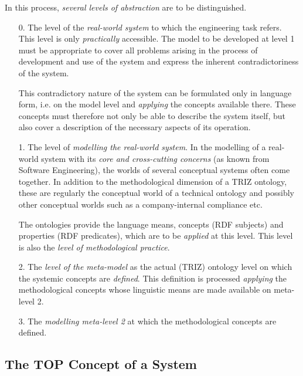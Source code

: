 \documentclass[11pt,a4paper]{article}
\begin{document}
In this process, \emph{several levels of abstraction} are to be distinguished.
\begin{itemize}[noitemsep]
\item [0.] The level of the \emph{real-world system} to which the engineering
  task refers. This level is only \emph{practically} accessible. The model to
  be developed at level 1 must be appropriate to cover all problems arising in
  the process of development and use of the system and express the inherent
  contradictoriness of the system.

  This contradictory nature of the system can be formulated only in language
  form, i.e. on the model level and \emph{applying} the concepts available
  there.  These concepts must therefore not only be able to describe the
  system itself, but also cover a description of the necessary aspects of its
  operation.
\item[1.] The level of \emph{modelling the real-world system}. In the
  modelling of a real-world system with its \emph{core and cross-cutting
    concerns} (as known from Software Engineering), the worlds of several
  conceptual systems often come together. In addition to the methodological
  dimension of a TRIZ ontology, these are regularly the conceptual world of a
  technical ontology and possibly other conceptual worlds such as a
  company-internal compliance etc.

  The ontologies provide the language means, concepts (RDF subjects) and
  properties (RDF predicates), which are to be \emph{applied} at this level.
  This level is also the \emph{level of methodological practice}.
\item[2.] The \emph{level of the meta-model} as the actual (TRIZ) ontology
  level on which the systemic concepts are \emph{defined}. This definition is
  processed \emph{applying} the methodological concepts whose linguistic means
  are made available on meta-level 2.
\item [3.] The \emph{modelling meta-level 2} at which the methodological
  concepts are defined.
\end{itemize}

\subsection{The TOP Concept of a System}
\end{document}
